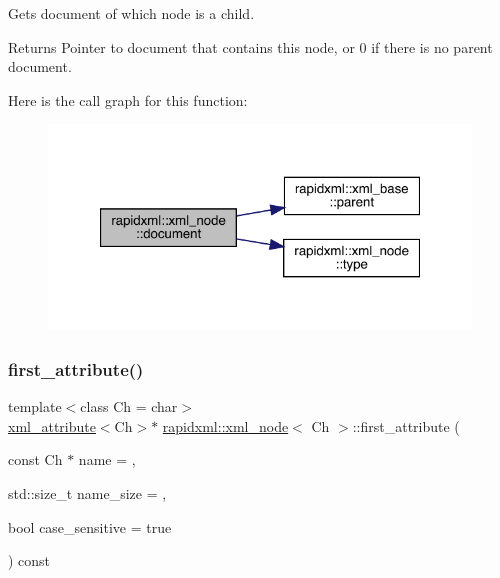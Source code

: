 Gets document of which node is a child. \begin{DoxyReturn}{Returns}
Pointer to document that contains this node, or 0 if there is no parent document. 
\end{DoxyReturn}
Here is the call graph for this function\+:\nopagebreak
\begin{figure}[H]
\begin{center}
\leavevmode
\includegraphics[width=321pt]{classrapidxml_1_1xml__node_af23d2d56182411e9261ca6974bfd767f_cgraph}
\end{center}
\end{figure}
\mbox{\label{classrapidxml_1_1xml__node_ab816ab6f13ee4b0588d5b76b0697511c}} 
\subsubsection{\texorpdfstring{first\_attribute()}{first\_attribute()}}
{\footnotesize\ttfamily template$<$class Ch = char$>$ \\
\mbox{\hyperlink{classrapidxml_1_1xml__attribute}{xml\+\_\+attribute}}$<$Ch$>$$\ast$ \mbox{\hyperlink{classrapidxml_1_1xml__node}{rapidxml\+::xml\+\_\+node}}$<$ Ch $>$\+::first\+\_\+attribute (\begin{DoxyParamCaption}\item[{const Ch $\ast$}]{name = {},  }\item[{std\+::size\+\_\+t}]{name\+\_\+size = {},  }\item[{bool}]{case\+\_\+sensitive = {\ttfamily true} }\end{DoxyParamCaption}) const\hspace{0.3cm}{\ttfamily [inline]}}

